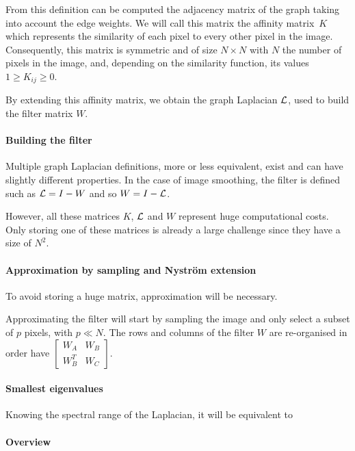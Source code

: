 From this definition can be computed the adjacency matrix of the graph taking into account the edge weights.
We will call this matrix the affinity matrix \(K\) which represents the similarity of each pixel to every other pixel in the image.
Consequently, this matrix is symmetric and of size \(N \times N\) with \(N\) the number of pixels in the image, and, depending on the similarity function, its values \(1 \ge K_{ij} \ge 0\).

By extending this affinity matrix, we obtain the graph Laplacian \(\operatorname{\mathcal{L}}\), used to build the filter matrix \(W\).

\paragraph{Building the filter}

Multiple graph Laplacian definitions, more or less equivalent, exist and can have slightly different properties.
In the case of image smoothing, the filter is defined such as \(\operatorname{\mathcal{L}} = I - W\) \cite{siam_slides_2016} and so \(W = I - \operatorname{\mathcal{L}}\).

However, all these matrices \(K\), \(\operatorname{\mathcal{L}}\) and \(W\) represent huge computational costs.
Only storing one of these matrices is already a large challenge since they have a size of \(N^2\).

\paragraph{Approximation by sampling and Nystr\"om extension}

To avoid storing a huge matrix, approximation will be necessary.

Approximating the filter will start by sampling the image and only select a subset of \(p\) pixels, with \(p \ll N\).
The rows and columns of the filter \(W\) are re-organised in order have \(\begin{bmatrix}W_A & W_B \\ W_B^T & W_C\end{bmatrix}\).

\paragraph{Smallest eigenvalues}

Knowing the spectral range of the Laplacian, it will be equivalent to 
\paragraph{Overview}

